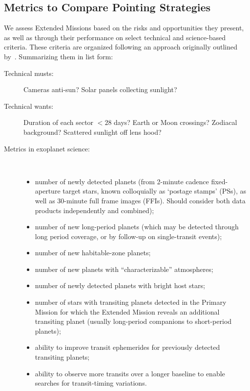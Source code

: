\subsection{Metrics to Compare Pointing Strategies}
\label{sec:comparing_pointing_strategies}

We assess Extended Missions based on the risks and opportunities they
present, as well as through their performance on select technical and
science-based criteria.  These criteria are organized following an
approach originally outlined by~\citet{kepner_rational_1965}.
Summarizing them in list form:
\begin{description}
\item[Technical musts:] Cameras anti-sun? Solar panels collecting sunlight?
\item[Technical wants:] Duration of each sector $<28$ days? Earth or Moon crossings? Zodiacal background? Scattered sunlight off lens hood?
\item[Metrics in exoplanet science:]\
	\begin{itemize}
	\item number of newly detected planets (from 2-minute cadence 
	fixed-aperture target stars, known colloquially as `postage stamps' (PSs), 
	as well as 30-minute full frame images (FFIs). Should consider 
	both data products independently and combined); 
	\item number of new long-period planets (which may be detected through long period coverage, or by follow-up on single-transit events); 
	\item number of new habitable-zone planets; 
	\item number of new planets with ``characterizable'' atmospheres; 
	\item number of newly detected planets with bright host stars; 
	\item number of stars with transiting planets detected in the Primary Mission for which the Extended Mission reveals an additional
          transiting planet (usually long-period companions to short-period planets);
        \item ability to improve transit ephemerides for previously detected transiting planets;
	\item ability to observe more transits over a longer baseline to enable searches for transit-timing variations.
        \end{itemize}
\end{description}

